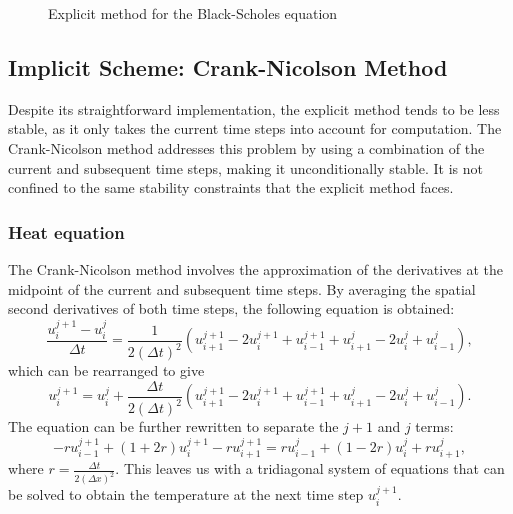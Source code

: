 \begin{figure}[H]
    \centering
    \caption{Explicit method for the Black-Scholes equation}
    \label{fig:bse-explicit}
\end{figure}

\subsection{Implicit Scheme: Crank-Nicolson Method}
Despite its straightforward implementation, the explicit method tends to be less stable, as it only takes the current time steps into account for computation. The Crank-Nicolson method addresses this problem by using a combination of the current and subsequent time steps, making it unconditionally stable. It is not confined to the same stability constraints that the explicit method faces.

\subsubsection{Heat equation}
The Crank-Nicolson method involves the approximation of the derivatives at the midpoint of the current and subsequent time steps. By averaging the spatial
second derivatives of both time steps, the following equation is obtained:
\begin{equation}
    \frac{u_i^{j+1} - u_i^j}{\Delta t} = \frac{1}{2(\Delta t)^2} (u_{i+1}^{j+1} - 2u_i^{j+1} + u_{i-1}^{j+1} + u_{i+1}^j - 2u_i^j + u_{i-1}^j),
\end{equation}
which can be rearranged to give
\begin{equation}
    u_i^{j+1} = u_i^j + \frac{\Delta t}{2(\Delta t)^2} (u_{i+1}^{j+1} - 2u_i^{j+1} + u_{i-1}^{j+1} + u_{i+1}^j - 2u_i^j + u_{i-1}^j).
\end{equation}
The equation can be further rewritten to separate the $j+1$ and $j$ terms:
\begin{equation}
    -r u_{i-1}^{j+1} + (1 + 2r) u_i^{j+1} - r u_{i+1}^{j+1} = r u_{i-1}^j + (1 - 2r) u_i^j + r u_{i+1}^j,
\end{equation}
where $r = \frac{\Delta t}{2(\Delta x)^2}$. This leaves us with a tridiagonal system of equations that can be solved to obtain the temperature at the next time step $u_i^{j+1}$.

